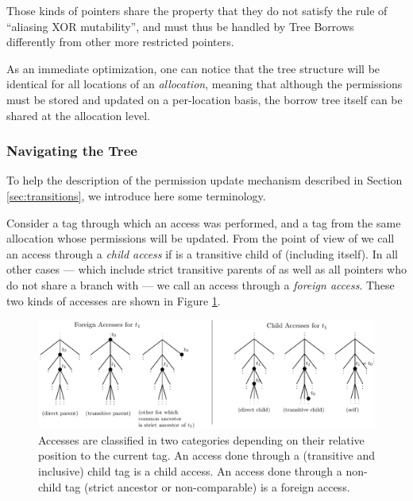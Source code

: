 \documentclass[a4paper,11pt]{article}
\theoremstyle{plain}
\theoremstyle{definition}
\theoremstyle{remark}
\newcommand{\tcode}[1]{\rstinline{#1}}
\begin{document}
Those kinds of pointers share the property that they do not satisfy the rule
of ``aliasing XOR mutability'', and must thus be handled by Tree Borrows differently
from other more restricted pointers.

As an immediate optimization, one can notice that the tree structure will
be identical for all locations of an \textit{allocation}, meaning that although
the permissions must be stored and updated on a per-location basis, the
borrow tree itself can be shared at the allocation level.

\subsubsection{Navigating the Tree}

To help the description of the permission update mechanism described in
Section \ref{sec:transitions}, we introduce here some terminology.

Consider a tag \tcode{t0} through which an access was performed, and a tag
\tcode{t1} from the same allocation whose permissions will be updated. From the point
of view of \tcode{t1} we call an access through \tcode{t0} a \textit{child access}
if \tcode{t0} is a transitive child of \tcode{t1} (including \tcode{t1} itself).
In all other cases --- which include strict transitive parents of \tcode{t1} as well as
all pointers who do not share a branch with \tcode{t1} --- we call an access through
\tcode{t0} a \textit{foreign access}. These two kinds of accesses are shown
in Figure \ref{fig:kinds-of-accesses}.

\begin{figure}
    \includegraphics[width=\textwidth]{../figs/accesses-kinds.pdf}
    \caption{Accesses are classified in two categories depending on their relative position
    to the current tag. An access done through a (transitive and inclusive) child tag is a child access.
    An access done through a non-child tag (strict ancestor or non-comparable) is a foreign access.}
    \label{fig:kinds-of-accesses}
\end{figure}
\end{document}

